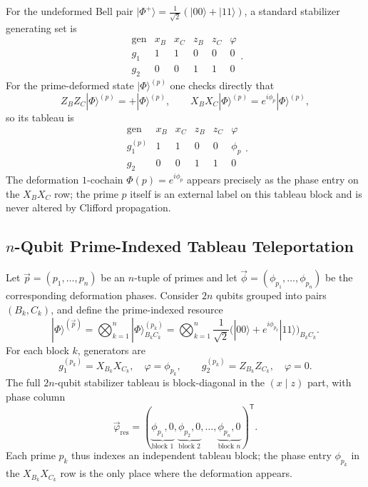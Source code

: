 \documentclass[11pt]{article}
\begin{document}
For the undeformed Bell pair $|\Phi^+\rangle = \frac{1}{\sqrt{2}}(|00\rangle+|11\rangle)$, a standard stabilizer generating set is
\[
\begin{array}{c|cccc|c}
\text{gen} & x_B & x_C & z_B & z_C & \varphi \\ \hline
g_1 & 1 & 1 & 0 & 0 & 0 \\
g_2 & 0 & 0 & 1 & 1 & 0
\end{array}.
\]
For the prime-deformed state $|\Phi\rangle^{(p)}$ one checks directly that
\[
Z_B Z_C |\Phi\rangle^{(p)} = + |\Phi\rangle^{(p)}, \qquad
X_B X_C |\Phi\rangle^{(p)} = e^{i\phi_p} |\Phi\rangle^{(p)},
\]
so its tableau is
\[
\begin{array}{c|cccc|c}
\text{gen} & x_B & x_C & z_B & z_C & \varphi \\ \hline
g_1^{(p)} & 1 & 1 & 0 & 0 & \phi_p \\
g_2        & 0 & 0 & 1 & 1 & 0
\end{array}.
\]
The deformation $1$-cochain $\Phi(p)=e^{i\phi_p}$ appears precisely as the phase entry on the $X_B X_C$ row; the prime $p$ itself is an external label on this tableau block and is never altered by Clifford propagation.

\subsection{\texorpdfstring{$n$}{n}-Qubit Prime-Indexed Tableau Teleportation}

Let $\vec p = (p_1,\dots,p_n)$ be an $n$-tuple of primes and let $\vec\phi = (\phi_{p_1},\dots,\phi_{p_n})$ be the corresponding deformation phases. Consider $2n$ qubits grouped into pairs $(B_k,C_k)$, and define the prime-indexed resource
\[
|\Phi\rangle^{(\vec p)} = \bigotimes_{k=1}^n |\Phi\rangle^{(p_k)}_{B_k C_k}
= \bigotimes_{k=1}^n \frac{1}{\sqrt{2}}\bigl(|00\rangle + e^{i\phi_{p_k}}|11\rangle\bigr)_{B_k C_k}.
\]
For each block $k$, generators are
\[
g_1^{(p_k)} = X_{B_k} X_{C_k}, \quad \varphi=\phi_{p_k},\qquad
g_2^{(p_k)} = Z_{B_k} Z_{C_k}, \quad \varphi=0.
\]
The full $2n$-qubit stabilizer tableau is block-diagonal in the $(x\mid z)$ part, with phase column
\[
\vec\varphi_{\mathrm{res}} =
(\underbrace{\phi_{p_1},0}_{\text{block }1},
 \underbrace{\phi_{p_2},0}_{\text{block }2},
 \dots,
 \underbrace{\phi_{p_n},0}_{\text{block }n})^{\mathsf T}.
\]
Each prime $p_k$ thus indexes an independent tableau block; the phase entry $\phi_{p_k}$ in the $X_{B_k} X_{C_k}$ row is the only place where the deformation appears.
\end{document}
